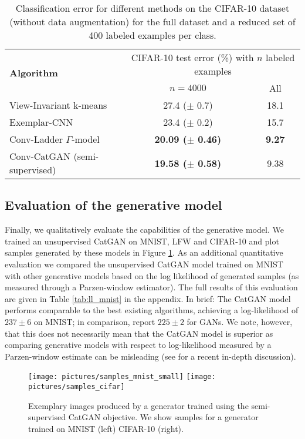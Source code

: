 \documentclass{article} \usepackage{iclr2016_conference,times}
\begin{document}
\begin{table}
  \begin{tabular}{lcc}
    \multirow{2}{*}{\bf Algorithm} & \multicolumn{2}{c}{CIFAR-10 test error (\%) with $n$ labeled examples} \\
                                   & $n = 4000$ & All \\
   \hline
    View-Invariant k-means \cite{Yuhui_2013} & 27.4 ($\pm$ 0.7) & 18.1 \\
    Exemplar-CNN \citep{Dosovits_NIPS2014} & 23.4 ($\pm$ 0.2) & 15.7 \\
    Conv-Ladder $\Gamma$-model \citep{Rasmus_NIPS2015} & \textbf{20.09 ($\pm$ 0.46)} & \textbf{9.27} \\
    \hline
    Conv-CatGAN (semi-supervised) & \textbf{19.58 ($\pm$ 0.58)} & 9.38 \\
  \end{tabular}
  \caption{Classification error for different methods on the CIFAR-10 dataset (without data augmentation) for the full dataset and a reduced set of 400 labeled examples per class.}
  \label{tab:cifar10}
\end{table}


\subsection{Evaluation of the generative model}
Finally, we qualitatively evaluate the capabilities of the generative model. We
trained an unsupervised CatGAN on MNIST,
LFW and CIFAR-10 and plot samples generated by these models in Figure
\ref{fig:samples_lfw}. As an additional quantitative evaluation we
compared the unsupervised CatGAN model trained on MNIST with other
generative models based on the log likelihood of generated samples (as
measured through a Parzen-window estimator). The full results of this
evaluation are given in Table \ref{tab:ll_mnist} in the appendix. In
brief: The CatGAN model performs comparable to the best existing
algorithms, achieving a log-likelihood of $237 \pm 6$ on MNIST; in
comparison, \citet{Goodfellow_NIPS2014} report $225 \pm 2$ for GANs.
We note, however, that this does not necessarily mean that the CatGAN
model is superior as comparing generative models with respect to
log-likelihood measured by a Parzen-window estimate can be misleading
(see \cite{Theis_2015} for a recent in-depth discussion).

\begin{figure}[t]
  \centering
  \texttt{[image: pictures/samples\_mnist\_small]}
  \texttt{[image: pictures/samples\_cifar]}
  \caption{Exemplary images produced by a generator trained using the
    semi-supervised CatGAN objective. We show samples for a generator
    trained on MNIST (left) CIFAR-10 (right).}
  \label{fig:samples_lfw}
\end{figure}
\end{document}
